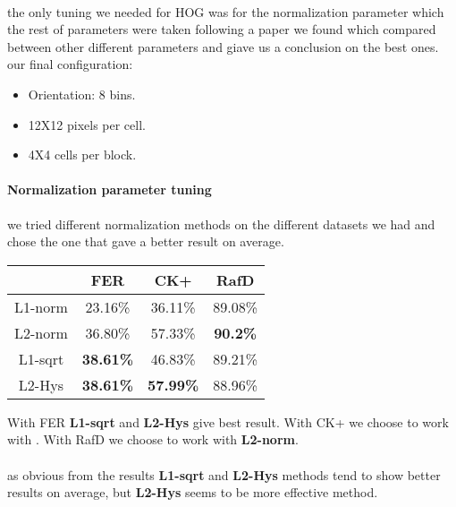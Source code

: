 \paragraph{}
the only tuning we needed for HOG was for the normalization parameter which the rest of parameters were taken following a paper\cite{HOG} we found which compared between other different parameters and giave us a conclusion on the best ones.\newline 
our final configuration: \newline
\begin{itemize}
\item Orientation: 8 bins. 
\item 12X12 pixels per cell. 
\item 4X4 cells per block.
\end{itemize}

\paragraph{Normalization parameter tuning}
we tried different normalization methods on the different datasets we had and chose the one that gave a better result on average.

\begin{center}
\begin{tabular}{ c|c|c|c }
	  & FER & CK+ & RafD \\ \hline
	 L1-norm & 23.16\% & 36.11\% & 89.08\% \\  
	 L2-norm & 36.80\% & 57.33\% & \textbf{90.2\%} \\
	 L1-sqrt & \textbf{38.61\%} & 46.83\% & 89.21\% \\
	 L2-Hys & \textbf{38.61\%} & \textbf{57.99\%} & 88.96\% \\
\end{tabular}
\end{center}
With FER \textbf{L1-sqrt} and \textbf{L2-Hys} give best result.\newline
With CK+ we choose to work with  .\newline
With RafD we choose to work with  \textbf{L2-norm}. \newline
\paragraph{}
as obvious from the results \textbf{L1-sqrt} and \textbf{L2-Hys} methods tend to show better results on average, but \textbf{L2-Hys} seems to be more effective method.
